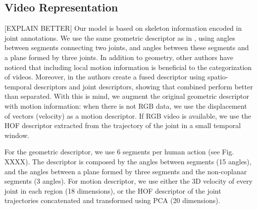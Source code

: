 \subsection{Video Representation} \label{subsec:videorepresentation}

[EXPLAIN BETTER]
Our model is based on skeleton information encoded in joint annotations.  We use the same geometric descriptor as in \cite{Lillo2014}, using angles between segments connecting two joints, and angles between these segments and a plane formed by three joints. In addition to geometry, other authors \cite{Zanfir2013,Tao2015,Wang2014} have noticed that including local motion information is beneficial to the categorization of videos. Moreover, in \cite{zhu2013fusing} the authors create a fused descriptor using spatio-temporal descriptors and joint descriptors, showing that combined perform better than separated. With this is mind, we augment the original geometric descriptor with motion information: when there is not RGB data, we use the displacement of vectors (velocity) as a motion descriptor. If RGB video is available, we use the HOF descriptor extracted from the trajectory of the joint in a small temporal window.

For the geometric descriptor, we use 6 segments per human action (see Fig. XXXX). The descriptor is composed by the angles between segments (15 angles), and the angles between a plane formed by three segments and the non-coplanar segments (3 angles). For motion descriptor, we use either the 3D velocity of every joint in each region (18 dimensions), or the HOF descriptor of the joint trajectories concatenated and transformed using PCA (20 dimensions).